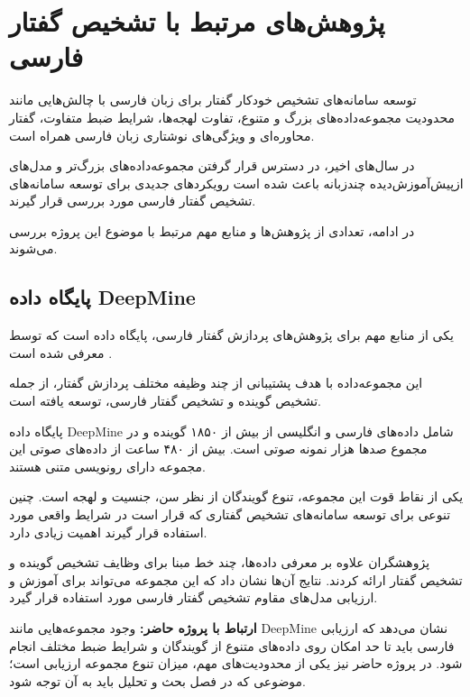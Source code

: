 \section{پژوهش‌های مرتبط با تشخیص گفتار فارسی}

توسعه سامانه‌های تشخیص خودکار گفتار برای زبان فارسی با چالش‌هایی
مانند محدودیت مجموعه‌داده‌های بزرگ و متنوع، تفاوت لهجه‌ها،
شرایط ضبط متفاوت، گفتار محاوره‌ای و ویژگی‌های نوشتاری زبان
فارسی همراه است.

در سال‌های اخیر، در دسترس قرار گرفتن مجموعه‌داده‌های بزرگ‌تر
و مدل‌های ازپیش‌آموزش‌دیده چندزبانه باعث شده است رویکردهای
جدیدی برای توسعه سامانه‌های تشخیص گفتار فارسی مورد بررسی
قرار گیرند.

در ادامه، تعدادی از پژوهش‌ها و منابع مهم مرتبط با موضوع این
پروژه بررسی می‌شوند.


\subsection{پایگاه داده DeepMine}

یکی از منابع مهم برای پژوهش‌های پردازش گفتار فارسی،
پایگاه داده
است که توسط
معرفی شده است
\cite{zeinali2019deepmine}.

این مجموعه‌داده با هدف پشتیبانی از چند وظیفه مختلف پردازش
گفتار، از جمله تشخیص گوینده و تشخیص گفتار فارسی، توسعه یافته
است.

پایگاه داده DeepMine شامل داده‌های فارسی و انگلیسی از بیش از
۱۸۵۰ گوینده و در مجموع صدها هزار نمونه صوتی است.
بیش از ۴۸۰ ساعت از داده‌های صوتی این مجموعه دارای رونویسی
متنی هستند.

یکی از نقاط قوت این مجموعه، تنوع گویندگان از نظر سن،
جنسیت و لهجه است.
چنین تنوعی برای توسعه سامانه‌های تشخیص گفتاری که قرار است
در شرایط واقعی مورد استفاده قرار گیرند اهمیت زیادی دارد.

پژوهشگران علاوه بر معرفی داده‌ها، چند خط مبنا برای وظایف
تشخیص گوینده و تشخیص گفتار ارائه کردند.
نتایج آن‌ها نشان داد که این مجموعه می‌تواند برای آموزش و
ارزیابی مدل‌های مقاوم تشخیص گفتار فارسی مورد استفاده قرار گیرد.

\textbf{ارتباط با پروژه حاضر:}
وجود مجموعه‌هایی مانند DeepMine نشان می‌دهد که ارزیابی 
فارسی باید تا حد امکان روی داده‌های متنوع از گویندگان و شرایط
ضبط مختلف انجام شود.
در پروژه حاضر نیز یکی از محدودیت‌های مهم، میزان تنوع مجموعه
ارزیابی است؛ موضوعی که در فصل بحث و تحلیل باید به آن توجه شود.


